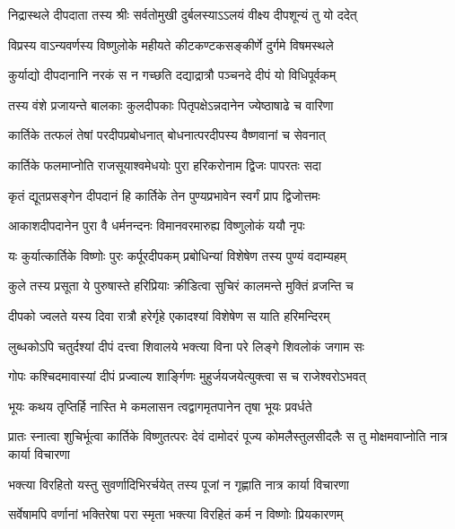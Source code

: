 \twolineshloka
{निद्रास्थले दीपदाता तस्य श्रीः सर्वतोमुखी}
{दुर्बलस्याऽऽलयं वीक्ष्य दीपशून्यं तु यो ददेत्} %

\twolineshloka
{विप्रस्य वाऽन्यवर्णस्य विष्णुलोके महीयते}
{कीटकण्टकसङ्कीर्णे दुर्गमे विषमस्थले} %

\twolineshloka
{कुर्याद्यो दीपदानानि नरकं स न गच्छति}
{दद्याद्रात्रौ पञ्चनदे दीपं यो विधिपूर्वकम्} %

\twolineshloka
{तस्य वंशे प्रजायन्ते बालकाः कुलदीपकाः}
{पितृपक्षेऽन्नदानेन ज्येष्ठाषाढे च वारिणा} %

\twolineshloka
{कार्तिके तत्फलं तेषां परदीपप्रबोधनात्}
{बोधनात्परदीपस्य वैष्णवानां च सेवनात्} %

\twolineshloka
{कार्तिके फलमाप्नोति राजसूयाश्वमेधयोः}
{पुरा हरिकरोनाम द्विजः पापरतः सदा} %

\twolineshloka
{कृतं द्यूतप्रसङ्गेन दीपदानं हि कार्तिके}
{तेन पुण्यप्रभावेन स्वर्गं प्राप द्विजोत्तमः} %

\twolineshloka
{आकाशदीपदानेन पुरा वै धर्मनन्दनः}
{विमानवरमारुह्य विष्णुलोकं ययौ नृपः} %

\twolineshloka
{यः कुर्यात्कार्तिके विष्णोः पुरः कर्पूरदीपकम्}
{प्रबोधिन्यां विशेषेण तस्य पुण्यं वदाम्यहम्} %

\twolineshloka
{कुले तस्य प्रसूता ये पुरुषास्ते हरिप्रियाः}
{क्रीडित्वा सुचिरं कालमन्ते मुक्तिं व्रजन्ति च} %

\twolineshloka
{दीपको ज्वलते यस्य दिवा रात्रौ हरेर्गृहे}
{एकादश्यां विशेषेण स याति हरिमन्दिरम्} %

\twolineshloka
{लुब्धकोऽपि चतुर्दश्यां दीपं दत्त्वा शिवालये}
{भक्त्या विना परे लिङ्गे शिवलोकं जगाम सः} %

\twolineshloka
{गोपः कश्चिदमावास्यां दीपं प्रज्वाल्य शार्ङ्गिणः}
{मुहुर्जयजयेत्युक्त्वा स च राजेश्वरोऽभवत्} %





\twolineshloka
{भूयः कथय तृप्तिर्हि नास्ति मे कमलासन}
{त्वद्वागमृतपानेन तृषा भूयः प्रवर्धते} %


\threelineshloka
{प्रातः स्नात्वा शुचिर्भूत्वा कार्तिके विष्णुतत्परः}
{देवं दामोदरं पूज्य कोमलैस्तुलसीदलैः}
{स तु मोक्षमवाप्नोति नात्र कार्या विचारणा} %

\twolineshloka
{भक्त्या विरहितो यस्तु सुवर्णादिभिरर्चयेत्}
{तस्य पूजां न गृह्णाति नात्र कार्या विचारणा} %

\twolineshloka
{सर्वेषामपि वर्णानां भक्तिरेषा परा स्मृता}
{भक्त्या विरहितं कर्म न विष्णोः प्रियकारणम्} %

